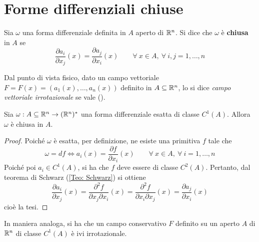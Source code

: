 \section{Forme differenziali chiuse}
\begin{definition} \label{Def: Forma differenziale chiusa}
    Sia $\omega$ una forma differenziale definita in $A$ aperto di $\mathbb{R}^n$. Si dice che $\omega$ è \textbf{chiusa} in $A$ se
    \begin{equation}
        \frac{\partial a_i}{\partial x_j}(x)= \frac{\partial a_j}{\partial x_i}(x) \qquad \forall\ x \in A,\ \forall\ i, j = 1, \dots, n
    \end{equation}
\end{definition}
Dal punto di vista fisico, dato un campo vettoriale $F=F(x)=(a_1(x), \dots, a_n(x))$ definito in $A \subseteq \mathbb{R}^n$, lo si dice \textit{campo vettoriale irrotazionale} se vale (\theequation). 
\begin{theorem} \label{Teo: Forma esatta => forma chiusa}
    Sia $\omega: A \subseteq \mathbb{R}^n \to (\mathbb{R}^n)^*$ una forma differenziale esatta di classe $C^1(A)$. Allora $\omega$ è chiusa in $A$.
\end{theorem}
\begin{proof}
    Poiché $\omega$ è esatta, per definizione, ne esiste una primitiva $f$ tale che
    \begin{equation}
        \omega= df \iff a_i(x)=\frac{\partial f }{\partial x_i}(x) \qquad \forall\ x \in A,\ \forall\ i=1, \dots, n
    \end{equation}
    Poiché poi $a_i \in C^1(A)$, si ha che $f$ deve essere di classe $C^2(A)$. Pertanto, dal teorema di Schwarz (\ref{Teo: Schwarz}) si ottiene
    \begin{equation}
        \frac{\partial a_i}{\partial x_j}(x)= \frac{\partial^2 f}{\partial x_j \partial x_i}(x) = \frac{\partial^2 f}{\partial x_i \partial x_j}(x) = \frac{\partial a_j}{\partial x_i}(x) 
    \end{equation}
    cioè la tesi.
\end{proof}
In maniera analoga, si ha che un campo conservativo $F$ definito su un aperto $A$ di $\mathbb{R}^n$ di classe $C^1(A)$ è ivi irrotazionale.
